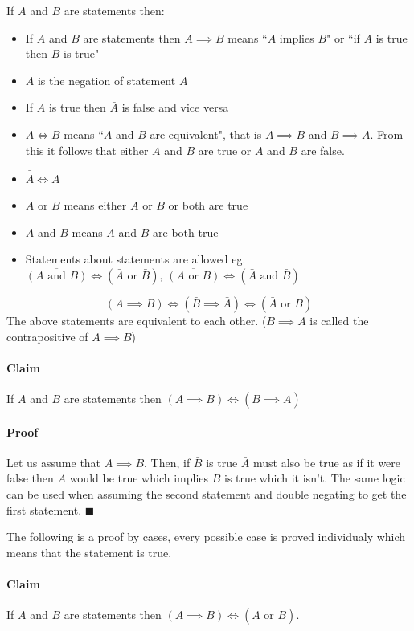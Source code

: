 \documentclass{article}
\begin{document}
If \(A\) and \(B\) are statements then:

\begin{itemize}
\item If \(A\) and \(B\) are statements then \(A\implies B\) means ``\(A\) implies \(B\)" or ``if \(A\) is true then \(B\) is true"
\item \(\bar A\) is the negation of statement \(A\)
\item If \(A\) is true then \(\bar A\) is false and vice versa
\item \(A\iff B\) means ``\(A\) and \(B\) are equivalent", that is \(A\implies B\) and \(B\implies A\). From this it follows that either \(A\) and \(B\) are true or \(A\) and \(B\) are false.
\item \(\bar{\bar{A}}\iff A\)
\item \(A\) or \(B\) means either \(A\) or \(B\) or both are true
\item \(A\) and \(B\) means \(A\) and \(B\) are both true
\item Statements about statements are allowed eg. \(\overline{(A \text{ and } B)}\iff(\bar A\text{ or } \bar B),\,\overline{(A \text{ or } B)}\iff(\bar A \text{ and } \bar B)\)
\end{itemize}

\[(A\implies B)\iff(\bar B\implies\bar A)\iff(\bar A \text{ or } B)\]
The above statements are equivalent to each other. (\(\bar B\implies \bar A\) is called the contrapositive of \(A\implies B\))

\paragraph{Claim} If \(A\) and \(B\) are statements then \((A\implies B)\iff(\bar B \implies \bar A)\)

\paragraph{Proof} Let us assume that \(A\implies B\). Then, if \(\bar B\) is true \(\bar A\) must also be true as if it were false then \(A\) would be true which implies \(B\) is true which it isn't. The same logic can be used when assuming the second statement and double negating to get the first statement. \(\blacksquare\)

The following is a proof by cases, every possible case is proved individualy which means that the statement is true. 

\paragraph{Claim} If \(A\) and \(B\) are statements then \((A\implies B)\iff(\bar A \text{ or } B)\).
\end{document}
